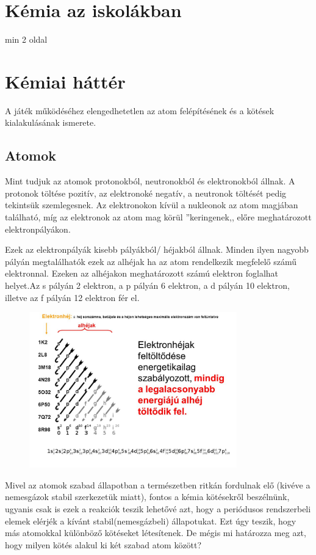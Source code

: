 \documentclass[colorlinks]{thesis-ekf}
\theoremstyle{definition}
\theoremstyle{remark}
\begin{document}
\chapter{Kémia az iskolákban}

min 2 oldal

\chapter{Kémiai háttér}

A játék működéséhez elengedhetetlen az atom felépítésének és a kötések kialakulásának ismerete. 
\section{Atomok}

Mint tudjuk az atomok protonokból, neutronokból és elektronokból állnak. A protonok töltése pozitív, az elektronoké negatív, a neutronok töltését pedig tekintsük szemlegesnek. Az elektronokon kívül a nukleonok az atom magjában található, míg az elektronok az atom mag körül ''keringenek,, előre meghatározott elektronpályákon.

Ezek az elektronpályák kisebb pályákból/ héjakból állnak. Minden ilyen nagyobb pályán megtalálhatók ezek az alhéjak ha az atom rendelkezik megfelelő számű elektronnal. Ezeken az alhéjakon meghatározott számú elektron foglalhat helyet.Az s pályán 2 elektron, a p pályán 6 elektron, a d pályán 10 elektron, illetve az f pályán 12 elektron fér el.\cite{sulinet_elektronpályák}
\begin{figure}[!ht]
	\centering
	\includegraphics[width=9cm]{elektronszerkezet}
	\caption{\cite{img_elektronkonfig}}\label{elektronszerkezet}
\end{figure}

Mivel az atomok szabad állapotban a természetben ritkán fordulnak elő (kivéve a nemesgázok stabil szerkezetük miatt), fontos a kémia kötésekről beszélnünk, ugyanis csak is ezek a reakciók teszik lehetővé azt, hogy a periódusos rendszerbeli elemek elérjék a kívánt stabil(nemesgázbeli) állapotukat. Ezt úgy teszik, hogy más atomokkal különböző kötéseket létesítenek.\cite{ionos_vidi} De mégis mi határozza meg azt, hogy milyen kötés alakul ki két szabad atom között?
\end{document}
